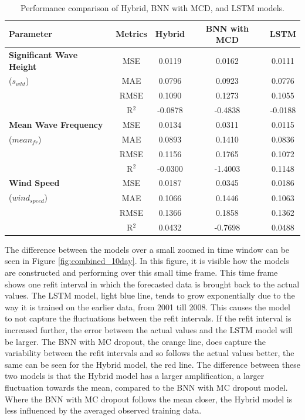 \begin{table}[ht!]
    \centering   
    \begin{tabular}{|l|c|c|c|c|}
        \hline
        \textbf{Parameter} & \textbf{Metrics} & \textbf{Hybrid} & \textbf{BNN with MCD} & \textbf{LSTM} \\
        \hline
        \textbf{Significant Wave Height}
        & MSE  & 0.0119 & 0.0162 & 0.0111 \\
        ($s_{wht}$) & MAE  & 0.0796 & 0.0923 & 0.0776 \\
        & RMSE & 0.1090 & 0.1273 & 0.1055 \\
        & R$^2$ & -0.0878 & -0.4838 & -0.0188 \\
        \hline
        \textbf{Mean Wave Frequency}
        & MSE  & 0.0134 & 0.0311 & 0.0115 \\
        ($mean_{fr}$) & MAE  & 0.0893 & 0.1410 & 0.0836 \\
        & RMSE & 0.1156 & 0.1765 & 0.1072 \\
        & R$^2$ & -0.0300 & -1.4003 & 0.1148 \\
        \hline
        \textbf{Wind Speed}
        & MSE  & 0.0187 & 0.0345 & 0.0186 \\
        ($wind_{speed}$) & MAE  & 0.1066 & 0.1446 & 0.1063 \\
        & RMSE & 0.1366 & 0.1858 & 0.1362 \\
        & R$^2$ & 0.0432 & -0.7698 & 0.0488 \\
        \hline
    \end{tabular}
    \caption{Performance comparison of Hybrid, BNN with MCD, and LSTM models.}
    \label{tab:performance_comparison}
\end{table}

\newpage

\noindent The difference between the models over a small zoomed in time window can be seen in Figure \ref{fig:combined_10day}. In this figure, it is visible how the models are constructed and performing over this small time frame. This time frame shows one refit interval in which the forecasted data is brought back to the actual values. The LSTM model, light blue line, tends to grow exponentially due to the way it is trained on the earlier data, from 2001 till 2008. This causes the model to not capture the fluctuations between the refit intervals. If the refit interval is increased further, the error between the actual values and the LSTM model will be larger. The BNN with MC dropout, the orange line, does capture the variability between the refit intervals and so follows the actual values better, the same can be seen for the Hybrid model, the red line. The difference between these two models is that the Hybrid model has a larger amplification, a larger fluctuation towards the mean, compared to the BNN with MC dropout model. Where the BNN with MC dropout follows the mean closer, the Hybrid model is less influenced by the averaged observed training data. 

